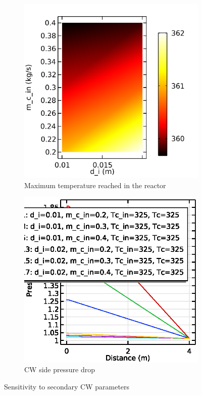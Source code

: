 \begin{figure}[h]
    \centering

    \begin{subfigure}{0.49\linewidth}
        \includegraphics[width=\linewidth]{figures/S2-maxT.png}
        \caption{Maximum temperature reached in the reactor}
        \label{fig:comsol-S2:maxT}
    \end{subfigure}
    \begin{subfigure}{0.49\linewidth}
        \includegraphics[width=\linewidth]{figures/S2-CW-Pdrop.eps}
        \caption{CW side pressure drop}
        \label{fig:comsol-S2:CW-Pdrop}
    \end{subfigure}

    \caption{Sensitivity to secondary CW parameters}
    \label{fig:comsol-S2}
\end{figure}
